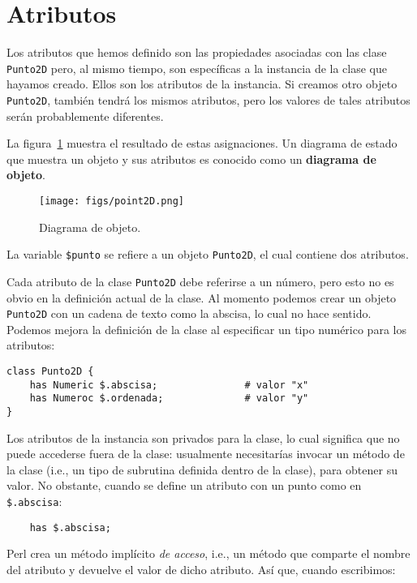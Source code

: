 \section{Atributos}
\label{attributes}

Los atributos que hemos definido son las propiedades asociadas
con las clase {\tt Punto2D} pero, al mismo tiempo, son específicas
a la instancia de la clase que hayamos creado. Ellos son los
atributos de la instancia. Si creamos otro objeto {\tt Punto2D},
también tendrá los mismos atributos, pero los valores de tales
atributos serán probablemente diferentes. 

La figura~\ref{fig.point2d} muestra el resultado de estas asignaciones.
Un diagrama de estado que muestra un objeto y sus atributos es conocido
como un {\bf diagrama de objeto}.

\begin{figure}
\centerline
{\texttt{[image: figs/point2D.png]}}
\caption{Diagrama de objeto.}
\label{fig.point2d}
\end{figure}

La variable {\tt \$punto} se refiere a un objeto {\tt Punto2D},
el cual contiene dos atributos. 

Cada atributo de la clase {\tt Punto2D} debe referirse a un 
número, pero esto no es obvio en la definición actual de la clase.
Al momento podemos crear un objeto {\tt Punto2D} con un cadena de texto
como la abscisa, lo cual no hace sentido. Podemos mejora la definición de
la clase al especificar un tipo numérico para los atributos:
%
\begin{verbatim}
class Punto2D {
	has Numeric $.abscisa;               # valor "x"
	has Numeroc $.ordenada;              # valor "y" 
}
\end{verbatim}
%
Los atributos de la instancia son privados para la clase,
lo cual significa que no puede accederse fuera de la clase:
usualmente necesitarías invocar un método de la clase (i.e., un
tipo de subrutina definida dentro de la clase), para obtener su
valor. No obstante, cuando se define un atributo con un punto como 
en \verb|$.abscisa|:

\begin{verbatim}
    has $.abscisa;  
\end{verbatim}
%
Perl crea un método implícito \emph{de acceso}, i.e., un método
que comparte el nombre del atributo y devuelve el valor de dicho
atributo. Así que, cuando escribimos:


